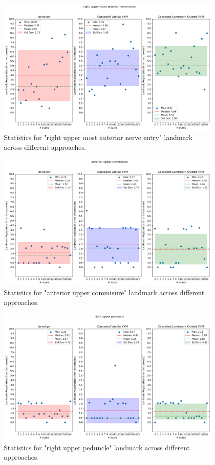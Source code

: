 \documentclass{report}
\begin{document}
\begin{figure}[h!]
	\centering
	\includegraphics[width=0.7\columnwidth]{resources/chapter5_fresh/output/right upper most anterior nerve entry.png}
	\caption{Statistics for "right upper most anterior nerve entry" landmark across different approaches.}
	\label{fig:landmark17}
\end{figure}

\begin{figure}[h!]
	\centering
	\includegraphics[width=0.7\columnwidth]{resources/chapter5_fresh/output/anterior upper commisure.png}
	\caption{Statistics for "anterior upper commisure" landmark across different approaches.}
	\label{fig:landmark18}
\end{figure}

\begin{figure}[h!]
	\centering
	\includegraphics[width=0.7\columnwidth]{resources/chapter5_fresh/output/right upper peduncle.png}
	\caption{Statistics for "right upper peduncle" landmark across different approaches.}
	\label{fig:landmark19}
\end{figure}
\end{document}
